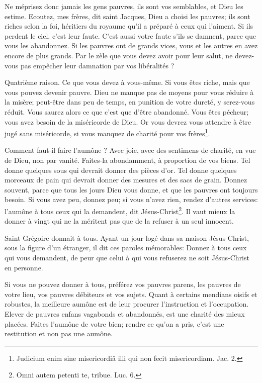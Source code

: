 \documentclass[instructions.tex]{subfiles}
\begin{document}
Ne méprisez donc jamais les gens pauvres, ils sont vos semblables, et Dieu les estime. Ecoutez, mes frères, dit saint Jacques, Dieu a choisi les pauvres; ils sont riches selon la foi, héritiers du royaume qu'il a préparé à ceux qui l'aiment. Si ils perdent le ciel, c'est leur faute. C'est aussi votre faute s'ils se damnent, parce que vous les abandonnez. Si les pauvres ont de grands vices, vous et les autres en avez encore de plus grands. Par le zèle que vous devez avoir pour leur salut, ne devez-vous pas empêcher leur damnation par vos libéralités ?
 
Quatrième raison. Ce que vous devez à vous-même. Si vous êtes riche, mais que vous pouvez devenir pauvre. Dieu ne manque pas de moyens pour vous réduire à la misère; peut-être dans peu de temps, en punition de votre dureté, y serez-vous réduit. Vous saurez alors ce que c'est que d'être abandonné. Vous êtes pécheur; vous avez besoin de la miséricorde de Dieu. Or vous devrez vous attendre à être jugé sans miséricorde, si vous manquez de charité pour vos frères\footnote{Judicium enim sine misericordiâ illi qui non fecit misericordiam. Jac. 2.}.
 
\secundo Comment faut-il faire l'aumône ? Avec joie, avec des sentimens de charité, en vue de Dieu, non par vanité. Faites-la abondamment, à proportion de vos biens. Tel donne quelques sous qui devrait donner des pièces d'or. Tel donne quelques morceaux de pain qui devrait donner des mesures et des sacs de grain. Donnez souvent, parce que tous les jours Dieu vous donne, et que les pauvres ont toujours besoin. Si vous avez peu, donnez peu; si vous n'avez rien, rendez d'autres services: l'aumône à tous ceux qui la demandent, dit Jésus-Christ\footnote{Omni autem petenti te, tribue. Luc. 6.}. Il vaut mieux la donner à vingt qui ne la méritent pas que de la refuser à un seul innocent.
 
Saint Grégoire donnait à tous. Ayant un jour logé dans sa maison Jésus-Christ, sous la figure d'un étranger, il dit ces paroles mémorables: Donnez à tous ceux qui vous demandent, de peur que celui à qui vous refuserez ne soit Jésus-Christ en personne.
 
Si vous ne pouvez donner à tous, préférez vos pauvres parens, les pauvres de votre lieu, vos pauvres débiteurs et vos sujets. Quant à certains mendians oisifs et robustes, la meilleure aumône est de leur procurer l'instruction et l'occupation. Elever de pauvres enfans vagabonds et abandonnés, est une charité des mieux placées. Faites l'aumône de votre bien; rendre ce qu'on a pris, c'est une restitution et non pas une aumône.
 
\end{document}
